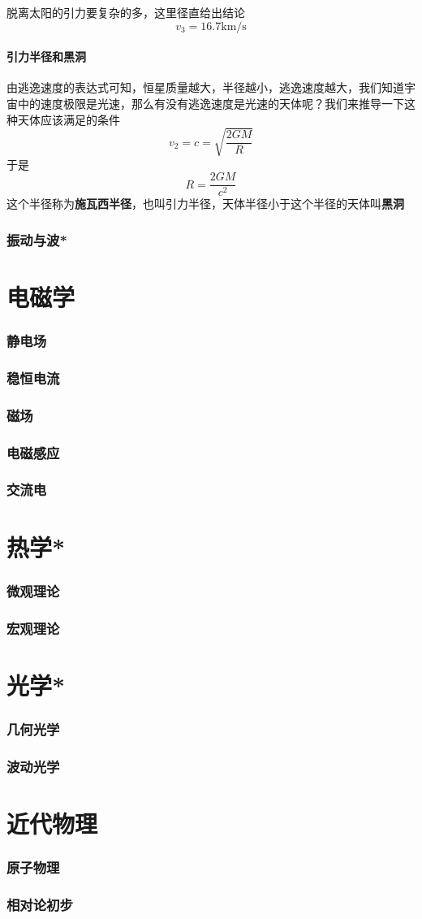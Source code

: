 \documentclass[hyperref,UTF8]{ctexart}
\begin{document}
脱离太阳的引力要复杂的多，这里径直给出结论
\[v_3 = 16.7\mathrm{km}/\mathrm{s}\]
\subsection{引力半径和黑洞}
由逃逸速度的表达式可知，恒星质量越大，半径越小，逃逸速度越大，我们知道宇宙中的速度极限是光速，那么有没有逃逸速度是光速的天体呢？我们来推导一下这种天体应该满足的条件
\[v_2= c = \sqrt{\frac{2GM}{R}}\]
于是
\[R = \frac{2GM}{c^2}\]
这个半径称为\textbf{施瓦西半径}，也叫引力半径，天体半径小于这个半径的天体叫\textbf{黑洞}
\section{振动与波*}

\part{电磁学}
\section{静电场}
\section{稳恒电流}
\section{磁场}
\section{电磁感应}
\section{交流电}
\part{热学*}
\section{微观理论}
\section{宏观理论}
\part{光学*}
\section{几何光学}
\section{波动光学}
\part{近代物理}
\section{原子物理}
\section{相对论初步}
\end{document}
